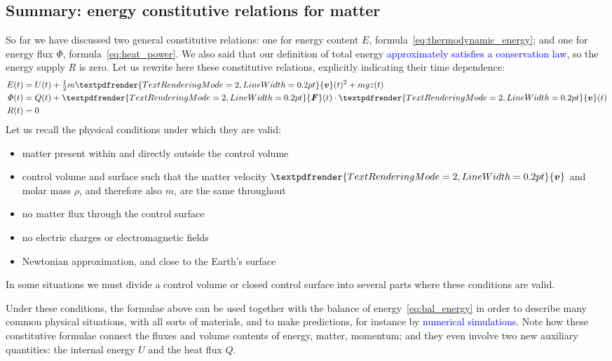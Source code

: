 \documentclass[a4paper,12pt,%
onecolumn,oneside,%
british%
]{memoir}
\renewcommand*{\bm}[1]{\textpdfrender{TextRenderingMode=2,LineWidth=0.2pt}{\boldsymbol{#1}}}
\renewcommand*{\|}[1][]{\nonscript\:#1\vert\nonscript\:\mathopen{}}
\newcommand*{\sect}{\S}%
\renewcommand*{\autoref}[2]{\sidepar{\vspace{-1ex}\footnotesize{\color{blue}\faIcon{%
angle-right%
}\enspace\sect~\ref{#1} page~\pageref{#1}}}\textcolor{blue}{#2}}
\newcommand*{\yv}{\bm{v}}
\newcommand*{\yrho}{\rho}
\newcommand*{\yM}{m}%
\newcommand*{\yE}{E}
\newcommand*{\yU}{U}
\newcommand*{\yH}{\varPhi}%
\newcommand*{\yQ}{Q}%
\newcommand*{\yR}{R}%
\newcommand*{\yF}{\bm{F}}
\begin{document}
\subsection{Summary: energy constitutive relations for matter}
\label{sec:summary_newton_energy}

So far we have discussed two general constitutive relations: one for energy content $\yE$, formula~\eqref{eq:thermodynamic_energy}; and one for energy flux $\yH$, formula~\eqref{eq:heat_power}. We also said that our definition of total energy \autoref{item:energy_no_supply}{approximately satisfies a conservation law}, so the energy supply $\yR$ is zero. Let us rewrite here these constitutive relations, explicitly indicating their time dependence:
\begin{equation*}
  \begin{aligned}
    \yE(t) &=  \yU(t) + \tfrac{1}{2}\yM \yv(t)^{2} + \yM g z(t)
    \\
    \yH(t) &= \yQ(t) + \yF(t)\cdot\yv(t)
    \\
    \yR(t) &= 0
  \end{aligned}
\end{equation*}
Let us recall the physical conditions under which they are valid:
\begin{itemize}[nosep]
\item matter present within and directly outside the control volume
\item control volume and surface such that the matter velocity $\yv$ and molar mass $\yrho$, and therefore also $\yM$, are the same throughout
\item no matter flux through the control surface
\item no electric charges or electromagnetic fields
\item Newtonian approximation, and close to the Earth's surface
\end{itemize}
\begin{warning}
In some situations we must divide a control volume or closed control surface into several parts where these conditions are valid.
\end{warning}


Under these conditions, the formulae above can be used together with the balance of energy~\eqref{eq:bal_energy} in order to describe many common physical situations, with all sorts of materials, and to make predictions, for instance by \autoref{sec:numeric_simulation}{numerical simulations}. Note how these constitutive formulae connect the fluxes and volume contents of energy, matter, momentum; and they even involve two new auxiliary quantities: the internal energy $\yU$ and the heat flux $\yQ$.
\end{document}
